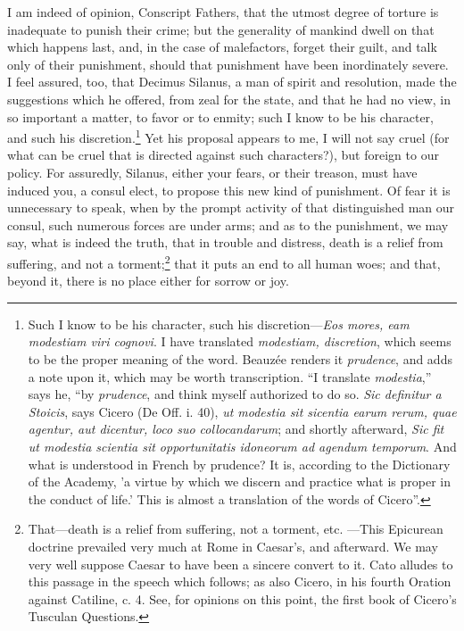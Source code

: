 I am indeed of opinion, Conscript Fathers, that the utmost degree of
torture is inadequate to punish their crime; but the generality of
mankind dwell on that which happens last, and, in the case of
malefactors, forget their guilt, and talk only of their punishment,
should that punishment have been inordinately severe. I feel assured,
too, that Decimus Silanus, a man of spirit and resolution, made the
suggestions which he offered, from zeal for the state, and that he had
no view, in so important a matter, to favor or to enmity; such I know
to be his character, and such his discretion.\footnote{Such I know to be his character, such his discretion—\emph{Eos
mores, eam modestiam viri cognovi}. I have translated \emph{modestiam,
discretion}, which seems to be the proper meaning of the word. Beauzée
renders it \emph{prudence}, and adds a note upon it, which may be worth
transcription. ``I translate \emph{modestia},'' says he, ``by \emph{prudence}, and
think myself authorized to do so. \emph{Sic definitur a Stoicis}, says
Cicero (De Off. i. 40), \emph{ut modestia sit sicentia earum rerum, quae
agentur, aut dicentur, loco suo collocandarum}; and shortly afterward,
\emph{Sic fit ut modestia scientia sit opportunitatis idoneorum ad agendum
temporum}. And what is understood in French by prudence? It is,
according to the Dictionary of the Academy, 'a virtue by which we
discern and practice what is proper in the conduct of life.' This is
almost a translation of the words of Cicero''.} Yet his proposal
appears to me, I will not say cruel (for what can be cruel that is
directed against such characters?), but foreign to our policy. For
assuredly, Silanus, either your fears, or their treason, must have
induced you, a consul elect, to propose this new kind of punishment.
Of fear it is unnecessary to speak, when by the prompt activity of
that distinguished man our consul, such numerous forces are under
arms; and as to the punishment, we may say, what is indeed the truth,
that in trouble and distress, death is a relief from suffering, and
not a torment;\footnote{That—death is a relief from suffering, not a torment, etc.
—This Epicurean doctrine prevailed very much at Rome in Caesar's, and
afterward. We may very well suppose Caesar to have been a sincere
convert to it. Cato alludes to this passage in the speech which
follows; as also Cicero, in his fourth Oration against Catiline, c. 4.
See, for opinions on this point, the first book of Cicero's Tusculan
Questions.} that it puts an end to all human woes; and that,
beyond it, there is no place either for sorrow or joy.

